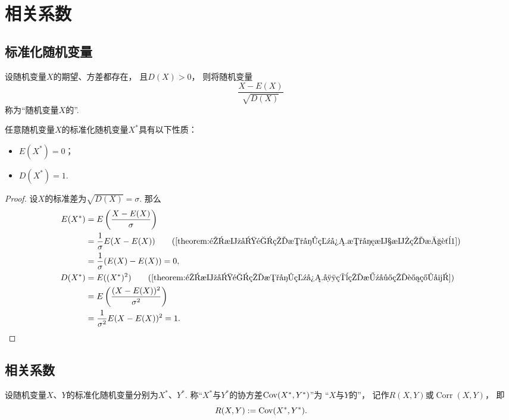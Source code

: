 \section{相关系数}
\subsection{标准化随机变量}
\begin{definition}
设随机变量\(X\)的期望、方差都存在，
且\(D(X) > 0\)，
则将随机变量\[
    \frac{X-E(X)}{\sqrt{D(X)}}
\]
称为“随机变量\(X\)的”.
\end{definition}

\begin{property}\label{theorem:随机变量的数字特征.标准化随机变量的数字特征}
任意随机变量\(X\)的标准化随机变量\(X^*\)具有以下性质：\begin{itemize}
    \item \(E(X^*)=0\)；
    \item \(D(X^*)=1\).
\end{itemize}
\begin{proof}
设\(X\)的标准差为\(\sqrt{D(X)}=\sigma\).
那么\begin{align*}
    E(X^*)
	&= E\left(\frac{X-E(X)}{\sigma}\right) \\
	&= \frac1\sigma E(X-E(X))
		\tag{\cref{theorem:随机变量的数字特征.数学期望的性质1}} \\
	&= \frac1\sigma (E(X) - E(X))
	= 0, \\
    D(X^*)
	&= E((X^*)^2)
		\tag{\cref{theorem:随机变量的数字特征.常用的方差的计算式}} \\
	&= E\left(\frac{(X-E(X))^2}{\sigma^2}\right) \\
	&= \frac{1}{\sigma^2} E(X-E(X))^2
	= 1.
    \qedhere
\end{align*}
\end{proof}
\end{property}

\subsection{相关系数}
\begin{definition}\label{definition:随机变量的数字特征.相关系数}
设随机变量\(X\)、\(Y\)的标准化随机变量分别为\(X^*\)、\(Y^*\).
称“\(X^*\)与\(Y^*\)的协方差\(\operatorname{Cov}(X^*,Y^*)\)”为
“\(X\)与\(Y\)的”，
记作\(R(X,Y)\)或\(\operatorname{Corr}(X,Y)\)，
即\[
    R(X,Y) := \operatorname{Cov}(X^*,Y^*).
\]
\end{definition}

